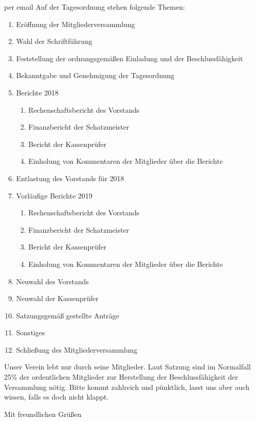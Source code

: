 \documentclass[../Vorlagen/de-RSE_Brief,a4paper]{scrlttr2}
\begin{document}
\begin{letter}{
    per email
}
\clearpage
\vspace{2em}
Auf der Tagesordnung stehen folgende Themen:
\begin{enumerate}
\setlength\itemsep{0em}
\item Eröffnung der Mitgliederversammlung
\item Wahl der Schriftführung
\item Feststellung der ordnungsgemäßen Einladung und der Beschlussfähigkeit
\item Bekanntgabe und Genehmigung der Tagesordnung
\item Berichte 2018
\begin{enumerate}
 \item Rechenschaftsbericht des Vorstands
 \item Finanzbericht der Schatzmeister
 \item Bericht der Kassenprüfer
 \item Einholung von Kommentaren der Mitglieder über die Berichte
\end{enumerate}
\item Entlastung des Vorstands für 2018
\item Vorläufige Berichte 2019
\begin{enumerate}
 \item Rechenschaftsbericht des Vorstands
 \item Finanzbericht der Schatzmeister
 \item Bericht der Kassenprüfer
 \item Einholung von Kommentaren der Mitglieder über die Berichte
\end{enumerate}
\item Neuwahl des Vorstands
\item Neuwahl der Kassenprüfer
\item Satzungsgemäß gestellte Anträge
\item Sonstiges
\item Schließung des Mitgliederversammlung
\end{enumerate}

Unser Verein lebt nur durch seine Mitglieder.
Laut Satzung sind im Normalfall 25\% der ordentlichen Mitglieder zur Herstellung der Beschlussfähigkeit der Versammlung nötig.
Bitte kommt zahlreich und pünktlich, lasst uns aber auch wissen, falls es doch nicht klappt.

\closing{Mit freundlichen Grüßen}
\end{letter}
\end{document}
